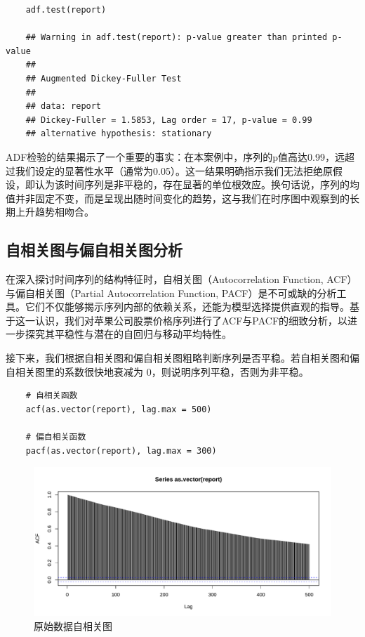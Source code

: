 \documentclass{article} %
\begin{document}
\begin{lstlisting}
    adf.test(report)

    ## Warning in adf.test(report): p-value greater than printed p-value
    ##
    ## Augmented Dickey-Fuller Test
    ##
    ## data: report
    ## Dickey-Fuller = 1.5853, Lag order = 17, p-value = 0.99
    ## alternative hypothesis: stationary
\end{lstlisting}

ADF检验的结果揭示了一个重要的事实：在本案例中，序列的p值高达0.99，远超过我们设定的显著性水平（通常为0.05）。这一结果明确指示我们无法拒绝原假设，即认为该时间序列是非平稳的，存在显著的单位根效应。换句话说，序列的均值并非固定不变，而是呈现出随时间变化的趋势，这与我们在时序图中观察到的长期上升趋势相吻合。


\subsection{自相关图与偏自相关图分析}
在深入探讨时间序列的结构特征时，自相关图（Autocorrelation Function, ACF）与偏自相关图（Partial Autocorrelation Function, PACF）是不可或缺的分析工具。它们不仅能够揭示序列内部的依赖关系，还能为模型选择提供直观的指导。基于这一认识，我们对苹果公司股票价格序列进行了ACF与PACF的细致分析，以进一步探究其平稳性与潜在的自回归与移动平均特性。

接下来，我们根据自相关图和偏自相关图粗略判断序列是否平稳。若自相关图和偏自相关图里的系数很快地衰减为 0，则说明序列平稳，否则为非平稳。

\begin{lstlisting}
    # 自相关函数
    acf(as.vector(report), lag.max = 500)

    # 偏自相关函数
    pacf(as.vector(report), lag.max = 300)
\end{lstlisting}

\begin{figure}[h] %
	\centering %
	\includegraphics[width=\textwidth]{pic/acf.pdf}
    \caption{原始数据自相关图} %
	\label{} %
\end{figure}
\end{document}
